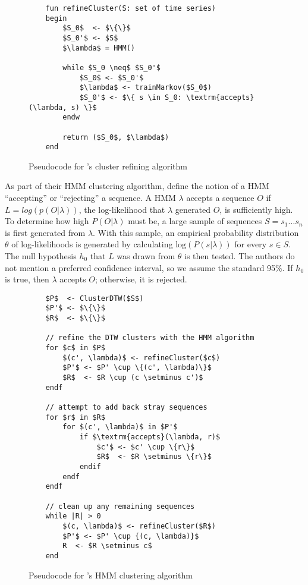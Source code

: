 \documentclass[12pt]{article}
\begin{document}
\begin{figure}
	\begin{lstlisting}
	fun refineCluster(S: set of time series)
	begin
		$S_0$  <- $\{\}$
		$S_0'$ <- $S$
		$\lambda$ = HMM()

		while $S_0 \neq$ $S_0'$
			$S_0$ <- $S_0'$
			$\lambda$ <- trainMarkov($S_0$)
			$S_0'$ <- $\{ s \in S_0: \textrm{accepts}(\lambda, s) \}$
		endw

		return ($S_0$, $\lambda$)
	end
	\end{lstlisting}
	\caption{Pseudocode for \citeauthor{oates}'s cluster refining algorithm}
	\label{fig:refinecluster}
\end{figure}

As part of their HMM clustering algorithm, \citeauthor{oates} define the notion of a HMM ``accepting'' or ``rejecting'' a sequence. A HMM $\lambda$ accepts a sequence $O$ if $L = log(p(O|\lambda))$, the log-likelihood that $\lambda$ generated $O$, is sufficiently high. To determine how high $P(O|\lambda)$ must be, a large sample of sequences $S = s_1 \dots s_n$ is first generated from $\lambda$. With this sample, an empirical probability distribution $\theta$ of log-likelihoods is generated by calculating $\textrm{log}(P(s|\lambda))$ for every $s \in S$. The null hypothesis $h_0$ that $L$ was drawn from $\theta$ is then tested. The authors do not mention a preferred confidence interval, so we assume the standard 95\%. If $h_0$ is true, then $\lambda$ accepts $O$; otherwise, it is rejected.

\begin{figure}
	\begin{lstlisting}
	$P$  <- ClusterDTW($S$)
	$P'$ <- $\{\}$
	$R$  <- $\{\}$

	// refine the DTW clusters with the HMM algorithm
	for $c$ in $P$
		$(c', \lambda)$ <- refineCluster($c$)
		$P'$ <- $P' \cup \{(c', \lambda)\}$
		$R$  <- $R \cup (c \setminus c')$
	endf

	// attempt to add back stray sequences
	for $r$ in $R$
		for $(c', \lambda)$ in $P'$
			if $\textrm{accepts}(\lambda, r)$
				$c'$ <- $c' \cup \{r\}$
				$R$  <- $R \setminus \{r\}$
			endif
		endf
	endf

	// clean up any remaining sequences
	while |R| > 0
		$(c, \lambda)$ <- refineCluster($R$)
		$P'$ <- $P' \cup {(c, \lambda)}$
		R  <- $R \setminus c$
	end

	\end{lstlisting}
	\caption{Pseudocode for \citeauthor{oates}'s HMM clustering algorithm}
	\label{fig:hmmcluster}
\end{figure}
\end{document}
